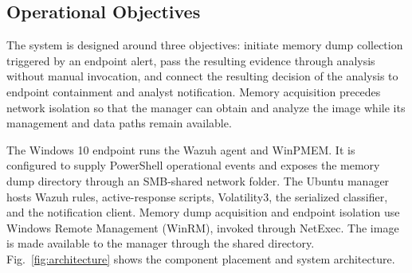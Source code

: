 \documentclass[conference]{IEEEtran}
\begin{document}
\subsection{Operational Objectives}
The system is designed around three objectives: initiate memory dump collection triggered by an endpoint alert, pass the resulting evidence through analysis without manual invocation, and connect the resulting decision of the analysis to endpoint containment and analyst notification. Memory acquisition precedes network isolation so that the manager can obtain and analyze the image while its management and data paths remain available. 

The Windows 10 endpoint runs the Wazuh agent and WinPMEM. It is configured to supply PowerShell operational events and exposes the memory dump directory through an SMB-shared network folder. The Ubuntu manager hosts Wazuh rules, active-response scripts, Volatility3, the serialized classifier, and the notification client. Memory dump acquisition and endpoint isolation use Windows Remote Management (WinRM), invoked through NetExec. The image is made available to the manager through the shared directory. Fig.~\ref{fig:architecture} shows the component placement and system architecture.
\end{document}
